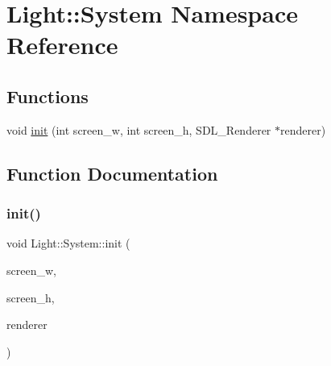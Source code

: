 \hypertarget{namespace_light_1_1_system}{}\section{Light\+:\+:System Namespace Reference}
\label{namespace_light_1_1_system}
\subsection*{Functions}
\begin{DoxyCompactItemize}
\item 
void \mbox{\hyperlink{namespace_light_1_1_system_a5ddbcc545e709af9de6a66dad4b901c0}{init}} (int screen\+\_\+w, int screen\+\_\+h, S\+D\+L\+\_\+\+Renderer $\ast$renderer)
\end{DoxyCompactItemize}


\subsection{Function Documentation}
\mbox{\label{namespace_light_1_1_system_a5ddbcc545e709af9de6a66dad4b901c0}} 
\subsubsection{\texorpdfstring{init()}{init()}}
{\footnotesize\ttfamily void Light\+::\+System\+::init (\begin{DoxyParamCaption}\item[{int}]{screen\+\_\+w,  }\item[{int}]{screen\+\_\+h,  }\item[{S\+D\+L\+\_\+\+Renderer $\ast$}]{renderer }\end{DoxyParamCaption})}

